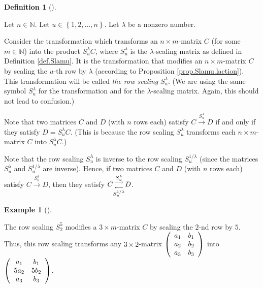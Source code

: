 \documentclass[numbers=enddot,12pt,final,onecolumn,notitlepage]{scrartcl}%
\theoremstyle{definition}
\newtheorem{defi}[theo]{Definition}
\newenvironment{definition}[1][]
{\begin{defi}[#1]\begin{leftbar}}
{\end{leftbar}\end{defi}}
\newtheorem{exam}[theo]{Example}
\newenvironment{example}[1][]
{\begin{exam}[#1]\begin{leftbar}}
{\end{leftbar}\end{exam}}
\begin{document}
\begin{definition}
\label{def.row-ops.row-scale}Let $n\in\mathbb{N}$. Let $u\in\left\{
1,2,\ldots,n\right\}  $. Let $\lambda$ be a nonzero number.

Consider the transformation which transforms an $n\times m$-matrix $C$ (for
some $m\in\mathbb{N}$) into the product $S_{u}^{\lambda}C$, where
$S_{u}^{\lambda}$ is the $\lambda$-scaling matrix as defined in Definition
\ref{def.Slamu}. It is the transformation that modifies an $n\times m$-matrix
$C$ by scaling the $u$-th row by $\lambda$ (according to Proposition
\ref{prop.Slamu.laction}). This transformation will be called \textit{the row
scaling }$S_{u}^{\lambda}$. (We are using the same symbol $S_{u}^{\lambda}$
for the transformation and for the $\lambda$-scaling matrix. Again, this
should not lead to confusion.)

Note that two matrices $C$ and $D$ (with $n$ rows each) satisfy
$C\overset{S_{u}^{\lambda}}{\longrightarrow}D$ if and only if they satisfy
$D=S_{u}^{\lambda}C$. (This is because the row scaling $S_{u}^{\lambda}$
transforms each $n\times m$-matrix $C$ into $S_{u}^{\lambda}C$.)

Note that the row scaling $S_{u}^{\lambda}$ is inverse to the row scaling
$S_{u}^{1/\lambda}$ (since the matrices $S_{u}^{\lambda}$ and $S_{u}%
^{1/\lambda}$ are inverse). Hence, if two matrices $C$ and $D$ (with $n$ rows
each) satisfy $C\overset{S_{u}^{\lambda}}{\longrightarrow}D$, then they
satisfy $C\underset{S_{u}^{1/\lambda}}{\overset{S_{u}^{\lambda}}{%
\genfrac{}{}{0pt}{1}{\longrightarrow}{\longleftarrow}%
}}D$.
\end{definition}

\begin{example}
The row scaling $S_{2}^{5}$ modifies a $3\times m$-matrix $C$ by scaling the
$2$-nd row by $5$. Thus, this row scaling transforms any $3\times2$-matrix
$\left(
\begin{array}
[c]{cc}%
a_{1} & b_{1}\\
a_{2} & b_{2}\\
a_{3} & b_{3}%
\end{array}
\right)  $ into $\left(
\begin{array}
[c]{cc}%
a_{1} & b_{1}\\
5a_{2} & 5b_{2}\\
a_{3} & b_{3}%
\end{array}
\right)  $.
\end{example}
\end{document}
